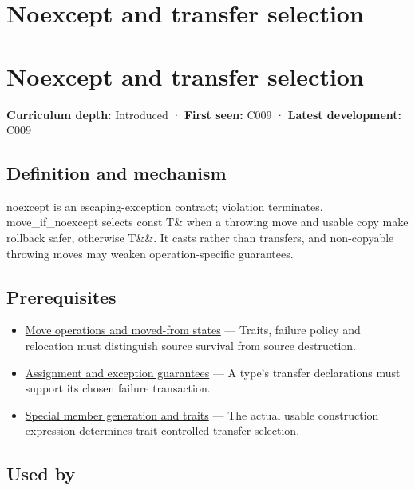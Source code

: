 \hypertarget{appendix-c746afaa47d1}{}
\section*{Noexcept and transfer selection}
\section{Noexcept and transfer selection}\label{appendix-c746afaa47d1-noexcept-and-transfer-selection}

\textbf{Curriculum depth:} Introduced · \textbf{First seen:} C009 · \textbf{Latest development:} C009

\subsection{Definition and mechanism}\label{appendix-c746afaa47d1-definition-and-mechanism}

noexcept is an escaping-exception contract; violation terminates. move\_if\_noexcept selects const T\& when a throwing move and usable copy make rollback safer, otherwise T\&\&. It casts rather than transfers, and non-copyable throwing moves may weaken operation-specific guarantees.

\subsection{Prerequisites}\label{appendix-c746afaa47d1-prerequisites}

\begin{itemize}
\tightlist
\item
  \hyperref[appendix-5636651017c2]{Move operations and moved-from states} --- Traits, failure policy and relocation must distinguish source survival from source destruction.
\item
  \hyperref[appendix-bea6beb5350f]{Assignment and exception guarantees} --- A type's transfer declarations must support its chosen failure transaction.
\item
  \hyperref[appendix-42e02a12c694]{Special member generation and traits} --- The actual usable construction expression determines trait-controlled transfer selection.
\end{itemize}

\subsection{Used by}\label{appendix-c746afaa47d1-used-by}

